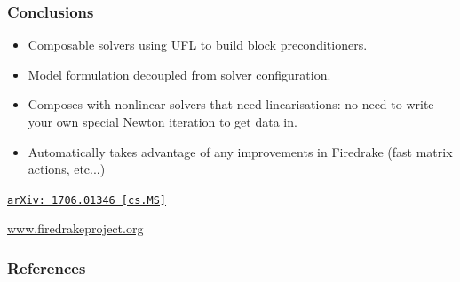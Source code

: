\documentclass[presentation,aspectratio=43]{beamer}
\newcommand{\arxivlink}[2]{%
  \href{http://www.arxiv.org/abs/#1}%
  {{\small\texttt{arXiv:\,#1\,[#2]}}}%
}
\begin{document}
\begin{frame}
  \frametitle{Conclusions}

  \begin{itemize}
  \item Composable solvers using UFL to build block preconditioners.

  \item Model formulation decoupled from solver configuration.

  \item Composes with nonlinear solvers that need linearisations: no
    need to write your own special Newton iteration to get data in.

  \item Automatically takes advantage of any improvements in Firedrake
    (fast matrix actions, etc...)

  \end{itemize}

  \begin{center}
    \textcite{Kirby:2018} \arxivlink{1706.01346}{cs.MS}

    \url{www.firedrakeproject.org}
  \end{center}
\end{frame}


\appendix
\begin{frame}
  \frametitle{References}
  \printbibliography[heading=none]
\end{frame}
\egroup
\end{document}
